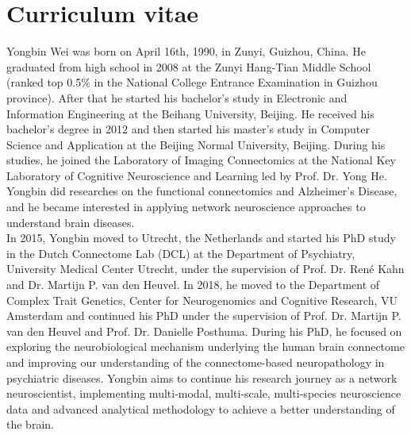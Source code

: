 \pagestyle{backmatter}


\chapter{Curriculum vitae}
\label{ch: cv}

Yongbin Wei was born on April 16th, 1990, in Zunyi, Guizhou, China. He graduated from high school in 2008 at the Zunyi Hang-Tian Middle School (ranked top 0.5\% in the National College Entrance Examination in Guizhou province). After that he started his bachelor's study in Electronic and Information Engineering at the Beihang University, Beijing. He received his bachelor's degree in 2012 and then started his master's study in Computer Science and Application at the Beijing Normal University, Beijing. During his studies, he joined the Laboratory of Imaging Connectomics at the National Key Laboratory of Cognitive Neuroscience and Learning led by Prof. Dr. Yong He. Yongbin did researches on the functional connectomics and Alzheimer's Disease, and he became interested in applying network neuroscience approaches to understand brain diseases. \\

In 2015, Yongbin moved to Utrecht, the Netherlands and started his PhD study in the Dutch Connectome Lab (DCL) at the Department of Psychiatry, University Medical Center Utrecht, under the supervision of Prof. Dr. René Kahn and Dr. Martijn P. van den Heuvel. In 2018, he moved to the Department of Complex Trait Genetics, Center for Neurogenomics and Cognitive Research, VU Amsterdam and continued his PhD under the supervision of Prof. Dr. Martijn P. van den Heuvel and Prof. Dr. Danielle Posthuma. During his PhD, he focused on exploring the neurobiological mechanism underlying the human brain connectome and improving our understanding of the connectome-based neuropathology in psychiatric diseases. Yongbin aims to continue his research journey as a network neuroscientist, implementing multi-modal, multi-scale, multi-species neuroscience data and advanced analytical methodology to achieve a better understanding of the brain.
